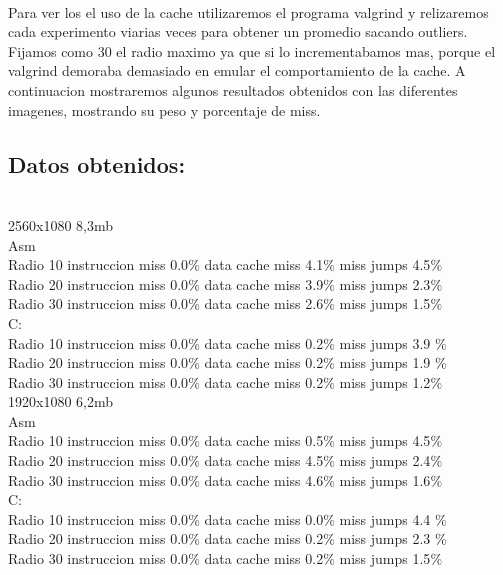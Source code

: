 \\
Para ver los el uso de la cache utilizaremos el programa valgrind y relizaremos cada experimento viarias veces para obtener un promedio sacando outliers. Fijamos como 30 el radio maximo ya que si lo incrementabamos mas, porque el  valgrind demoraba demasiado en emular el comportamiento de la cache. A continuacion mostraremos algunos resultados obtenidos con las diferentes imagenes, mostrando su peso y porcentaje de miss. \\

\subsection{Datos obtenidos:}\\

2560x1080 8,3mb \\

Asm \\
	Radio 10   instruccion miss   0.0$\%$  data cache miss  4.1$\%$ miss jumps   4.5$\%$ \\
	Radio 20   instruccion miss   0.0$\%$  data cache miss  3.9$\%$ miss jumps   2.3$\%$ \\	
	Radio 30   instruccion miss   0.0$\%$  data cache miss  2.6$\%$ miss jumps   1.5$\%$ \\

C: \\
	Radio 10  instruccion miss  0.0$\%$  data cache miss 0.2$\%$ miss jumps  3.9 $\%$  \\
	Radio 20  instruccion miss  0.0$\%$  data cache miss 0.2$\%$ miss jumps   1.9 $\%$  \\
	Radio 30  instruccion miss  0.0$\%$  data cache miss 0.2$\%$ miss jumps   1.2$\%$  \\ 

1920x1080 6,2mb \\

Asm \\
	Radio 10   instruccion miss   0.0$\%$  data cache miss  0.5$\%$ miss jumps   4.5$\%$ \\
	Radio 20   instruccion miss   0.0$\%$  data cache miss  4.5$\%$ miss jumps   2.4$\%$ \\	
	Radio 30   instruccion miss   0.0$\%$  data cache miss  4.6$\%$ miss jumps   1.6$\%$ \\

C: \\
	Radio 10  instruccion miss  0.0$\%$  data cache miss 0.0$\%$ miss jumps  4.4 $\%$  \\
	Radio 20  instruccion miss  0.0$\%$  data cache miss 0.2$\%$ miss jumps   2.3 $\%$  \\
	Radio 30  instruccion miss  0.0$\%$  data cache miss 0.2$\%$ miss jumps   1.5$\%$  \\ 

